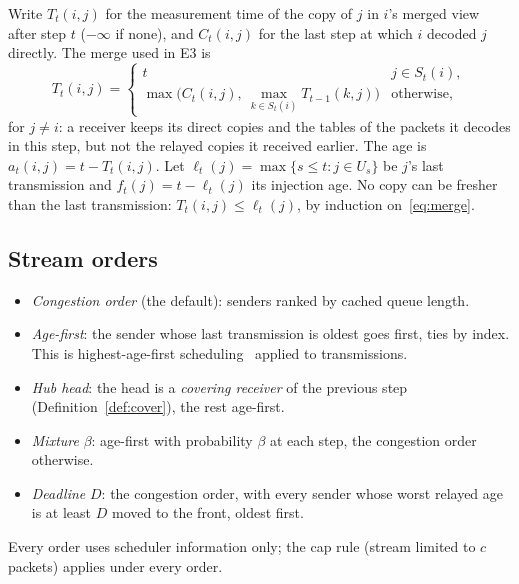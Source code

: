 \documentclass[11pt]{article}
\theoremstyle{definition}
\begin{document}
Write $T_t(i,j)$ for the measurement time of the copy of $j$ in $i$'s merged view after step $t$ ($-\infty$ if none), and
$C_t(i,j)$ for the last step at which $i$ decoded $j$ directly. The merge used in E3 is
\begin{equation}\label{eq:merge}
T_t(i,j)=\begin{cases} t & j\in S_t(i),\\ \max\big(C_t(i,j),\ \max_{k\in S_t(i)}T_{t-1}(k,j)\big) & \text{otherwise,}\end{cases}
\end{equation}
for $j\ne i$: a receiver keeps its direct copies and the tables of the packets it decodes in this step, but not the
relayed copies it received earlier. The age is $a_t(i,j)=t-T_t(i,j)$. Let $\ell_t(j)=\max\{s\le t:j\in U_s\}$ be $j$'s last
transmission and $f_t(j)=t-\ell_t(j)$ its injection age. No copy can be fresher than the last transmission:
$T_t(i,j)\le\ell_t(j)$, by induction on~\eqref{eq:merge}.

\subsection{Stream orders}\label{sec:orders}
\begin{itemize}
\item \emph{Congestion order} (the default): senders ranked by cached queue length.
\item \emph{Age-first}: the sender whose last transmission is oldest goes first, ties by index. This is highest-age-first
scheduling~\cite{kadota2018} applied to transmissions.
\item \emph{Hub head}: the head is a \emph{covering receiver} of the previous step (Definition~\ref{def:cover}), the rest age-first.
\item \emph{Mixture} $\beta$: age-first with probability $\beta$ at each step, the congestion order otherwise.
\item \emph{Deadline} $D$: the congestion order, with every sender whose worst relayed age is at least $D$ moved to the
front, oldest first.
\end{itemize}
Every order uses scheduler information only; the cap rule (stream limited to $c$ packets) applies under every order.
\end{document}
